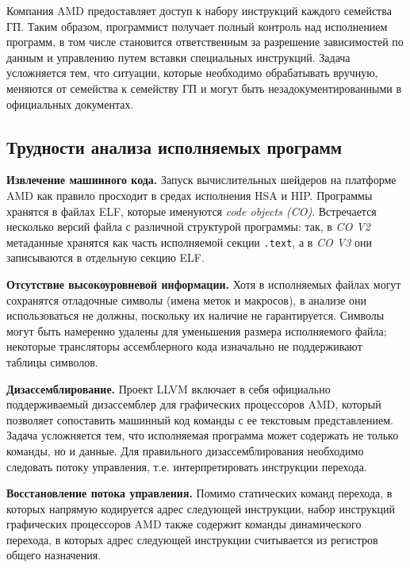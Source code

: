 \documentclass[a4paper,14pt]{extarticle}
\newcommand{\topic}[2]{\textbf{#1.} #2\newline}
\begin{document}
Компания AMD предоставляет доступ к набору инструкций каждого семейства ГП. Таким образом,
программист получает полный контроль над исполнением программ, в том числе становится
ответственным за разрешение зависимостей по данным и управлению путем вставки специальных
инструкций.
Задача усложняется тем, что ситуации, которые необходимо обрабатывать вручную,
меняются от семейства к семейству ГП и могут быть незадокументированными в официальных документах.

\subsection{Трудности анализа исполняемых программ}

\topic{Извлечение машинного кода}{Запуск вычислительных шейдеров на платформе AMD как правило просходит
в средах исполнения HSA и HIP. Программы хранятся в файлах ELF, которые именуются \textit{code objects (CO)}.
Встречается несколько версий файла с различной структурой программы: так,
в \textit{CO V2} метаданные хранятся как часть исполняемой секции \texttt{.text}, а
в \textit{CO V3} они записываются в отдельную секцию ELF.}

\topic{Отсутствие высокоуровневой информации}{Хотя в исполняемых файлах могут сохранятся отладочные символы
(имена меток и макросов), в анализе они использоваться не должны, поскольку их наличие не гарантируется.
Символы могут быть намеренно удалены для уменьшения размера исполняемого файла;
некоторые трансляторы ассемблерного кода изначально не поддерживают таблицы символов.}

\topic{Дизассемблирование}{Проект LLVM включает в себя официально поддерживаемый дизассемблер
для графических процессоров AMD, который позволяет сопоставить машинный код команды с ее текстовым
представлением. Задача усложняется тем, что исполняемая программа может содержать не только команды,
но и данные. Для правильного дизассемблирования необходимо следовать потоку управления,
т.е. интерпретировать инструкции перехода.}

\topic{Восстановление потока управления}{Помимо статических команд перехода, в которых напрямую
кодируется адрес следующей инструкции, набор инструкций графических процессоров AMD также содержит
команды динамического перехода, в которых адрес следующей инструкции считывается из регистров
общего назначения.}
\end{document}
